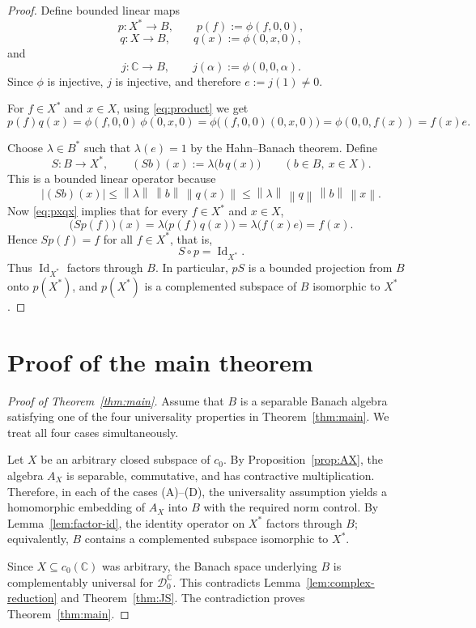\documentclass[11pt]{amsart}
\newcommand{\C}{\mathbb{C}}
\newcommand{\norm}[1]{\left\lVert #1\right\rVert}
\newcommand{\id}{\operatorname{Id}}
\renewcommand{\le}{\leqslant}
\theoremstyle{plain}
\theoremstyle{remark}
\numberwithin{equation}{section}
\begin{document}
\begin{proof}
Define bounded linear maps
\[
p:X^*\to B,\qquad p(f):=\phi(f,0,0),
\]
\[
q:X\to B,\qquad q(x):=\phi(0,x,0),
\]
and
\[
j:\C\to B,\qquad j(\alpha):=\phi(0,0,\alpha).
\]
Since $\phi$ is injective, $j$ is injective, and therefore $e:=j(1)\neq 0$.

For $f\in X^*$ and $x\in X$, using \eqref{eq:product} we get
\begin{equation}\label{eq:pxqx}
p(f)q(x)
= \phi(f,0,0)\,\phi(0,x,0)
= \phi\bigl((f,0,0)(0,x,0)\bigr)
= \phi(0,0,f(x))
= f(x)e.
\end{equation}

Choose $\lambda\in B^*$ such that $\lambda(e)=1$ by the Hahn--Banach theorem. Define
\[
S:B\to X^*,
\qquad
(Sb)(x):=\lambda\bigl(b\,q(x)\bigr)
\qquad (b\in B,\ x\in X).
\]
This is a bounded linear operator because
\[
|(Sb)(x)| \le \norm{\lambda}\,\norm{b}\,\norm{q(x)}
\le \norm{\lambda}\,\norm{q}\,\norm{b}\,\norm{x}.
\]
Now \eqref{eq:pxqx} implies that for every $f\in X^*$ and $x\in X$,
\[
\bigl(Sp(f)\bigr)(x)
= \lambda\bigl(p(f)q(x)\bigr)
= \lambda\bigl(f(x)e\bigr)
= f(x).
\]
Hence $Sp(f)=f$ for all $f\in X^*$, that is,
\[
S\circ p = \id_{X^*}.
\]
Thus $\id_{X^*}$ factors through $B$. In particular, $pS$ is a bounded projection from $B$ onto $p(X^*)$, and $p(X^*)$ is a complemented subspace of $B$ isomorphic to $X^*$.
\end{proof}

\section{Proof of the main theorem}

\begin{proof}[Proof of Theorem~\ref{thm:main}]
Assume that $B$ is a separable Banach algebra satisfying one of the four universality properties in Theorem~\ref{thm:main}. We treat all four cases simultaneously.

Let $X$ be an arbitrary closed subspace of $c_0$. By Proposition~\ref{prop:AX}, the algebra $A_X$ is separable, commutative, and has contractive multiplication. Therefore, in each of the cases \textup{(A)}--\textup{(D)}, the universality assumption yields a homomorphic embedding of $A_X$ into $B$ with the required norm control. By Lemma~\ref{lem:factor-id}, the identity operator on $X^*$ factors through $B$; equivalently, $B$ contains a complemented subspace isomorphic to $X^*$.

Since $X\subseteq c_0(\C)$ was arbitrary, the Banach space underlying $B$ is complementably universal for $\mathcal D_0^{\C}$. This contradicts Lemma~\ref{lem:complex-reduction} and Theorem~\ref{thm:JS}. The contradiction proves Theorem~\ref{thm:main}.
\end{proof}
\end{document}
